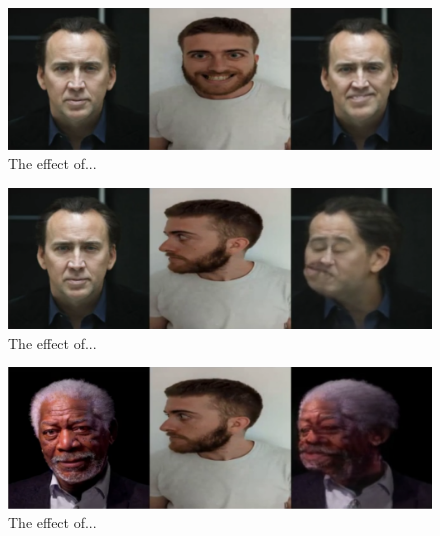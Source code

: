 \documentclass[english,12pt]{article}
\begin{document}
\begin{figure}[htb]
  \begin{centering}
      \includegraphics[scale=0.29]{images/‏‏Oren_smile_cage.PNG}
  \par\end{centering}
  \caption{\label{fig:Oren_smile_cage}The effect of...}
\end{figure}

\begin{figure}[htb]
  \begin{centering}
      \includegraphics[scale=0.29]{images/Oren_tilt_cage.PNG}
  \par\end{centering}
  \caption{\label{fig:Oren_tilt_cage}The effect of...}
\end{figure}

\begin{figure}[htb]
  \begin{centering}
      \includegraphics[scale=0.29]{images/Oren_tilt_freeman.PNG}
  \par\end{centering}
  \caption{\label{fig:Oren_tilt_freeman}The effect of...}
\end{figure}
\end{document}
